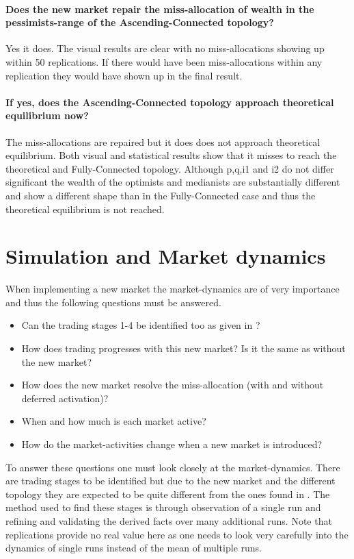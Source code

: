 \documentclass[Bachelorarbeit.tex]{subfiles}
\begin{document}
\paragraph{Does the new market repair the miss-allocation of wealth in the pessimists-range of the Ascending-Connected topology?}
Yes it does. The visual results are clear with no miss-allocations showing up within 50 replications. If there would have been miss-allocations within any replication they would have shown up in the final result.

\paragraph{If yes, does the Ascending-Connected topology approach theoretical equilibrium now?}
The miss-allocations are repaired but it does does not approach theoretical equilibrium. Both visual and statistical results show that it misses to reach the theoretical and Fully-Connected topology. Although p,q,i1 and i2 do not differ significant the wealth of the optimists and medianists are substantially different and show a different shape than in the Fully-Connected case and thus the theoretical equilibrium is not reached.

\section{Simulation and Market dynamics}
When implementing a new market the market-dynamics are of very importance and thus the following questions must be answered.

\begin{itemize}
\item Can the trading stages 1-4 be identified too as given in \cite{Breuer2015}?
\item How does trading progresses with this new market? Is it the same as without the new market?
\item How does the new market resolve the miss-allocation (with and without deferred activation)?
\item When and how much is each market active? 
\item How do the market-activities change when a new market is introduced?
\end{itemize}

To answer these questions one must look closely at the market-dynamics. There are trading stages to be identified but due to the new market and the different topology they are expected to be quite different from the ones found in \cite{Breuer2015}. The method used to find these stages is through observation of a single run and refining and validating the derived facts over many additional runs. Note that replications provide no real value here as one needs to look very carefully into the dynamics of single runs instead of the mean of multiple runs.
\end{document}
